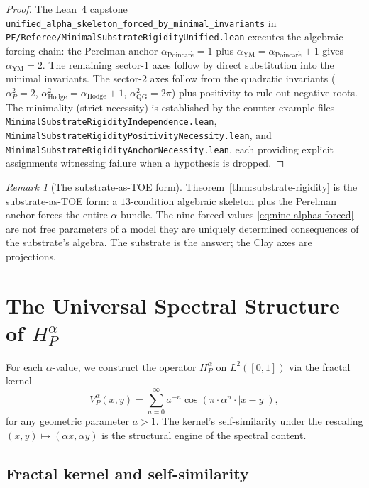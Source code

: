 \documentclass[11pt,a4paper,reqno]{amsart}
\theoremstyle{plain}
\theoremstyle{definition}
\theoremstyle{remark}
\newtheorem{remark}[theorem]{Remark}
\newcommand{\aPo}{\alpha_{\mathrm{Poincar\acute{e}}}}
\newcommand{\aP}{\alpha_{P}}
\newcommand{\aYM}{\alpha_{\mathrm{YM}}}
\newcommand{\aHodge}{\alpha_{\mathrm{Hodge}}}
\newcommand{\aQG}{\alpha_{\mathrm{QG}}}
\newcommand{\code}[1]{\texttt{#1}}
\newcommand{\HP}{H_{P}}
\newcommand{\VP}{V_{P}}
\begin{document}
\begin{proof}
The Lean~4 capstone
\code{unified\_alpha\_skeleton\_forced\_by\_minimal\_invariants} in
\code{PF/Referee/MinimalSubstrateRigidityUnified.lean} executes the
algebraic forcing chain: the Perelman anchor $\aPo = 1$ plus
$\aYM = \aPo + 1$ gives $\aYM = 2$. The remaining sector-1 axes follow
by direct substitution into the minimal invariants. The sector-2 axes
follow from the quadratic invariants ($\aP^{2} = 2$, $\aHodge^{2} =
\aHodge + 1$, $\aQG^{2} = 2\pi$) plus positivity to rule out negative
roots. The minimality (strict necessity) is established by the
counter-example files
\code{MinimalSubstrateRigidityIndependence.lean},
\code{MinimalSubstrateRigidityPositivityNecessity.lean}, and
\code{MinimalSubstrateRigidityAnchorNecessity.lean}, each providing
explicit assignments witnessing failure when a hypothesis is dropped.
\end{proof}

\begin{remark}[The substrate-as-TOE form]
\label{rem:substrate-as-toe}
Theorem~\ref{thm:substrate-rigidity} is the substrate-as-TOE form: a
$13$-condition algebraic skeleton plus the Perelman anchor forces the
entire $\alpha$-bundle. The nine forced values
\eqref{eq:nine-alphas-forced} are not free parameters of a model
they are uniquely determined consequences of the substrate's algebra.
The substrate is the answer; the Clay axes are projections.
\end{remark}

\section{The Universal Spectral Structure of \texorpdfstring{$\HP^{\alpha}$}{H\_P}}
\label{sec:spectral-structure}

For each $\alpha$-value, we construct the operator $\HP^{\alpha}$ on
$L^{2}([0,1])$ via the fractal kernel
\[
\VP^{\alpha}(x, y) = \sum_{n=0}^{\infty} a^{-n} \cos(\pi \cdot
\alpha^{n} \cdot |x - y|),
\]
for any geometric parameter $a > 1$. The kernel's self-similarity
under the rescaling $(x, y) \mapsto (\alpha x, \alpha y)$ is the
structural engine of the spectral content.

\subsection{Fractal kernel and self-similarity}
\end{document}
